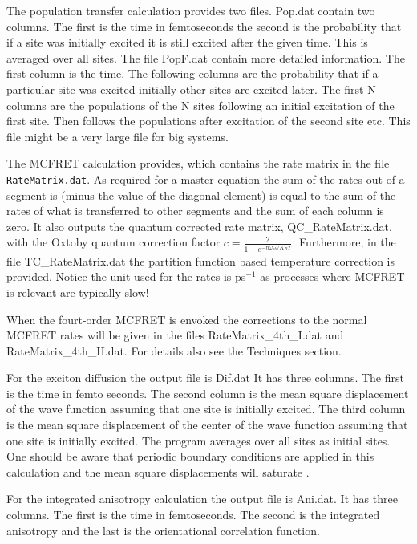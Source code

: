 The population transfer calculation provides two files. Pop.dat contain two columns.
The first is the time in femtoseconds the second is the probability that if a site was
initially excited it is still excited after the given time. This is averaged over all
sites. The file PopF.dat contain more detailed information. The first column is the
time. The following columns are the probability that if a particular site was excited
initially other sites are excited later. The first N columns are the populations of
the N sites following an initial excitation of the first site. Then follows the
populations after excitation of the second site etc. This file might be a very large
file for big systems.

The MCFRET calculation provides, which contains the rate matrix in the file
{\tt RateMatrix.dat}. As required for a master equation the sum of the rates out of
a segment is (minus the value of the diagonal element) is equal to the sum of the
rates of what is transferred to other segments and the sum of each column is zero.
It also outputs the quantum corrected rate matrix, QC\_RateMatrix.dat, with the
Oxtoby quantum correction factor $c = \frac{2}{1+e^{-\hbar \omega_{ab}/K_BT}}$.
Furthermore, in the file TC\_RateMatrix.dat the partition function based temperature
correction is provided. Notice the unit used for the rates is ps$^{-1}$ as processes
where MCFRET is relevant are typically slow!

When the fourt-order MCFRET is envoked the corrections to the normal MCFRET rates will
be given in the files RateMatrix\_4th\_I.dat and RateMatrix\_4th\_II.dat. For details
also see the Techniques section.

For the exciton diffusion the output file is Dif.dat It has three columns. The first is
the time in femto seconds. The second column is the mean square displacement of the
wave function assuming that one site is initially excited. The third column is the
mean square displacement of the center of the  wave function assuming that one site
is initially excited. The program averages over all sites as initial sites. One should
be aware that periodic boundary conditions are applied in this calculation
and the mean square displacements will saturate \cite{Jansen.2010.JCP.132.224503}.

For the integrated anisotropy calculation the output file is Ani.dat. It has three
columns. The first is the time in femtoseconds. The second is the integrated anisotropy
and the last is the orientational correlation function.


